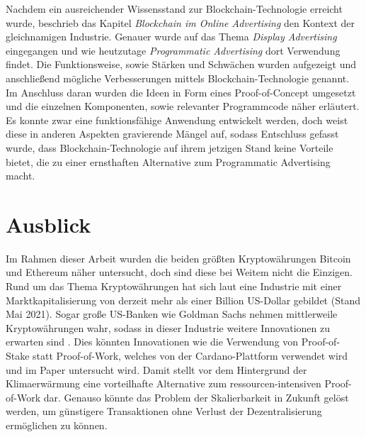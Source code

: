 Nachdem ein ausreichender Wissensstand zur Blockchain-Technologie erreicht wurde, beschrieb das Kapitel \emph{Blockchain im Online Advertising} den Kontext der gleichnamigen Industrie. Genauer wurde auf das Thema \emph{Display Advertising} eingegangen und wie heutzutage \emph{Programmatic Advertising} dort Verwendung findet. Die Funktionsweise, sowie Stärken und Schwächen wurden aufgezeigt und anschließend mögliche Verbesserungen mittels Blockchain-Technologie genannt. Im Anschluss daran wurden die Ideen in Form eines Proof-of-Concept umgesetzt und die einzelnen Komponenten, sowie relevanter Programmcode näher erläutert.\\

Es konnte zwar eine funktionsfähige Anwendung entwickelt werden, doch weist diese in anderen Aspekten gravierende Mängel auf, sodass Entschluss gefasst wurde, dass Blockchain-Technologie auf ihrem jetzigen Stand keine Vorteile bietet, die zu einer ernsthaften Alternative zum Programmatic Advertising macht.
\section{Ausblick}
Im Rahmen dieser Arbeit wurden die beiden größten Kryptowährungen Bitcoin und Ethereum näher untersucht, doch sind diese bei Weitem nicht die Einzigen. Rund um das Thema Kryptowährungen hat sich laut \cite{coinmarketcap_2021} eine Industrie mit einer Marktkapitalisierung von derzeit mehr als einer Billion US-Dollar gebildet (Stand Mai 2021). Sogar große US-Banken wie Goldman Sachs nehmen mittlerweile Kryptowährungen wahr, sodass in dieser Industrie weitere Innovationen zu erwarten sind \cite{handelsblatt_2021}. Dies könnten Innovationen wie die Verwendung von Proof-of-Stake statt Proof-of-Work, welches von der Cardano-Plattform verwendet wird und im Paper \cite{kiayias_2019} untersucht wird. Damit stellt vor dem Hintergrund der Klimaerwärmung eine vorteilhafte Alternative zum ressourcen-intensiven Proof-of-Work dar. Genauso könnte das Problem der Skalierbarkeit in Zukunft gelöst werden, um günstigere Transaktionen ohne Verlust der Dezentralisierung ermöglichen zu können.\\

